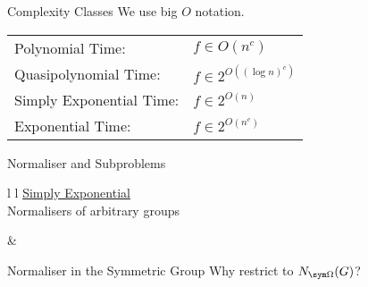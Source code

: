 \begin{frame}{Complexity Classes}
    We use big $O$ notation.
    \pause
    \\[2em]
    \hspace{2em}
    \begin{tabular}{l l}
    Polynomial Time:
    &
    $f \in O(n ^ c)$
    \\
    \pause
    Quasipolynomial Time:
    &
    $f \in 2 ^ {O((\log n) ^ c)}$
    \\
    \pause
    Simply Exponential Time:
    &
    $f \in 2 ^ {O(n)}$
    \\
    \pause
    Exponential Time:
    &
    $f \in 2 ^ {O(n ^ c)}$
    \end{tabular}
\end{frame}


\begin{frame}{Normaliser and Subproblems}
    \begin{tabular}{l l}
        {\underline{Simply Exponential} \hspace{4em} $~$}
        \\[0.5em]
        {Normalisers of arbitrary groups}
        \\[2.5em]
        \pause

        \pause
        &
    \end{tabular}
    \vfill
\end{frame}

\begin{frame}{Normaliser in the Symmetric Group}
    \centering
    \Large
    Why restrict to $N_{\sym \Omega}(G)$?
\end{frame}

